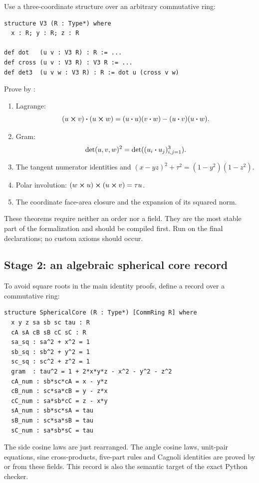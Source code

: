 Use a three-coordinate structure over an arbitrary commutative ring:
\begin{lstlisting}[language={}]
structure V3 (R : Type*) where
  x : R; y : R; z : R

def dot   (u v : V3 R) : R := ...
def cross (u v : V3 R) : V3 R := ...
def det3  (u v w : V3 R) : R := dot u (cross v w)
\end{lstlisting}
Prove by :
\begin{enumerate}
\item Lagrange:
\[
 (u\mathbin{\boldsymbol{\times}} v)\mathbin{\boldsymbol{\cdot}}(u\mathbin{\boldsymbol{\times}} w)
 =(u\mathbin{\boldsymbol{\cdot}} u)(v\mathbin{\boldsymbol{\cdot}} w)-(u\mathbin{\boldsymbol{\cdot}} v)(u\mathbin{\boldsymbol{\cdot}} w).
\]
\item Gram:
\[
 \operatorname{det}(u,v,w)^2=\operatorname{det}((u_i\mathbin{\boldsymbol{\cdot}} u_j)_{i,j=1}^3).
\]
\item The tangent numerator identities and
\((x-yz)^2+\tau^2=(1-y^2)(1-z^2)\).
\item Polar involution:
\((w\mathbin{\boldsymbol{\times}} u)\mathbin{\boldsymbol{\times}}(u\mathbin{\boldsymbol{\times}} v)=\tau u\).
\item The coordinate face-area closure and the expansion of its squared norm.
\end{enumerate}
These theorems require neither an order nor a field.  They are the most stable
part of the formalization and should be compiled first.  Run
 on the final declarations; no custom axioms should occur.

\subsection{Stage 2: an algebraic spherical core record}

To avoid square roots in the main identity proofs, define a record over a
commutative ring:
\begin{lstlisting}[language={}]
structure SphericalCore (R : Type*) [CommRing R] where
  x y z sa sb sc tau : R
  cA sA cB sB cC sC : R
  sa_sq : sa^2 + x^2 = 1
  sb_sq : sb^2 + y^2 = 1
  sc_sq : sc^2 + z^2 = 1
  gram  : tau^2 = 1 + 2*x*y*z - x^2 - y^2 - z^2
  cA_num : sb*sc*cA = x - y*z
  cB_num : sc*sa*cB = y - z*x
  cC_num : sa*sb*cC = z - x*y
  sA_num : sb*sc*sA = tau
  sB_num : sc*sa*sB = tau
  sC_num : sa*sb*sC = tau
\end{lstlisting}
The side cosine laws are just  rearranged.  The angle cosine laws,
unit-pair equations, sine cross-products, five-part rules and Cagnoli identities
are proved by  or  from these fields.  This
record is also the semantic target of the exact Python checker.

